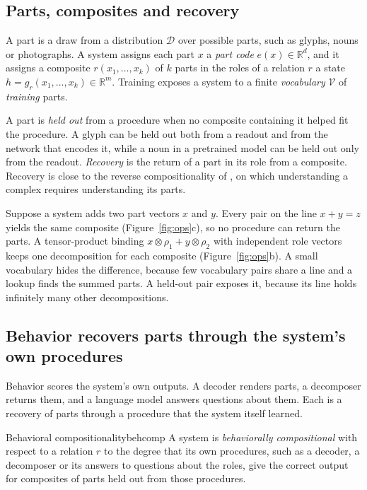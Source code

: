 \documentclass[10pt]{article}
\theoremstyle{plain}
\theoremstyle{remark}
\newcommand{\R}{\mathbb{R}}
\newcommand{\D}{\mathcal{D}}
\newcommand{\Voc}{\mathcal{V}}
\begin{document}
\subsection{Parts, composites and recovery}
\label{sec:intuition}

A part is a draw from a distribution $\D$ over possible parts, such as glyphs, nouns or photographs. A system assigns each part $x$ a \emph{part code} $e(x) \in \R^d$, and it assigns a composite $r(x_1, \ldots, x_k)$ of $k$ parts in the roles of a relation $r$ a state $h = g_r(x_1, \ldots, x_k) \in \R^m$. Training exposes a system to a finite \emph{vocabulary} $\Voc$ of \emph{training} parts.

A part is \emph{held out} from a procedure when no composite containing it helped fit the procedure. A glyph can be held out both from a readout and from the network that encodes it, while a noun in a pretrained model can be held out only from the readout. \emph{Recovery} is the return of a part in its role from a composite. Recovery is close to the reverse compositionality of \citet{fodor2002}, on which understanding a complex requires understanding its parts.

Suppose a system adds two part vectors $x$ and $y$. Every pair on the line $x + y = z$ yields the same composite (Figure~\ref{fig:ops}c), so no procedure can return the parts. A tensor-product binding $x \otimes \rho_1 + y \otimes \rho_2$ with independent role vectors \citep{smolensky1990} keeps one decomposition for each composite (Figure~\ref{fig:ops}b). A small vocabulary hides the difference, because few vocabulary pairs share a line and a lookup finds the summed parts. A held-out pair exposes it, because its line holds infinitely many other decompositions.

\subsection{Behavior recovers parts through the system's own procedures}
\label{sec:notions}

Behavior scores the system's own outputs. A decoder renders parts, a decomposer returns them, and a language model answers questions about them. Each is a recovery of parts through a procedure that the system itself learned.

\begin{defbox}{Behavioral compositionality}{behcomp}
A system is \emph{behaviorally compositional} with respect to a relation $r$ to the degree that its own procedures, such as a decoder, a decomposer or its answers to questions about the roles, give the correct output for composites of parts held out from those procedures.
\end{defbox}
\end{document}
